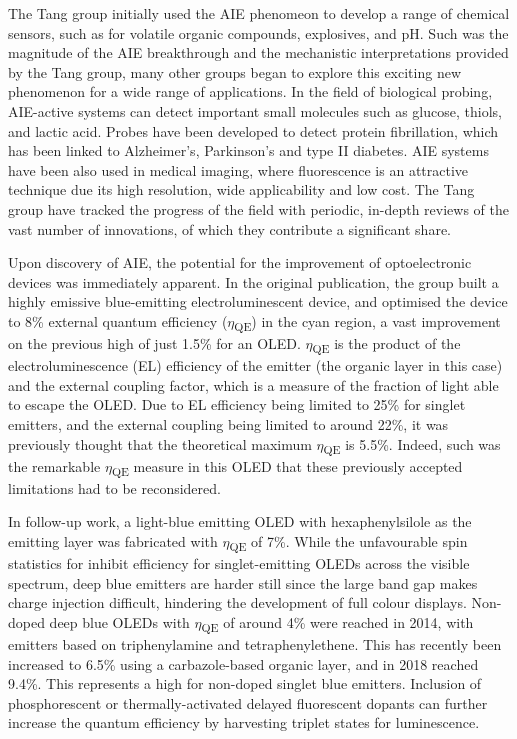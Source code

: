 The Tang group initially used the AIE phenomeon to develop a range of chemical sensors, such as for volatile organic compounds, explosives, and pH.\cite{Dong2007,Li2005,Li2009} Such was the magnitude of the AIE breakthrough and the mechanistic interpretations provided by the Tang group, many other groups began to explore this exciting new phenomenon for a wide range of applications. In the field of biological probing, AIE-active systems can detect important small molecules such as glucose, thiols, and lactic acid.\cite{Wang2014,Yuan2014,Shen2012} Probes have been developed to detect protein fibrillation, which has been linked to Alzheimer's, Parkinson's and type II diabetes.\cite{Hong2012} AIE systems have been also used in medical imaging, where fluorescence is an attractive technique due its high resolution, wide applicability and low cost.\cite{Mei2015} The Tang group have tracked the progress of the field with periodic, in-depth reviews of the vast number of innovations, of which they contribute a significant share.\cite{Hong2009,Wang2010a,Hong2011,Mei2014,Hu2014,Mei2015}

Upon discovery of AIE, the potential for the improvement of optoelectronic devices was immediately apparent. In the original publication, the group built a highly emissive blue-emitting electroluminescent device, and optimised the device to 8\% external quantum efficiency ($\eta$\textsubscript{QE}) in the cyan region, a vast improvement on the previous high of just 1.5\% for an OLED. \cite{Luo2001,Chen2002} $\eta$\textsubscript{QE} is the product of the electroluminescence (EL) efficiency of the emitter (the organic layer in this case) and the external coupling factor, which is a measure of the fraction of light able to escape the OLED. Due to EL efficiency being limited to 25\% for singlet emitters, and the external coupling being limited to around 22\%, it was previously thought that the theoretical maximum $\eta$\textsubscript{QE} is 5.5\%. Indeed, such was the remarkable $\eta$\textsubscript{QE} measure in this OLED that these previously accepted limitations had to be reconsidered.

In follow-up work, a light-blue emitting OLED with hexaphenylsilole as the emitting layer was fabricated with $\eta$\textsubscript{QE} of 7\%.\cite{Chen2003} While the unfavourable spin statistics for inhibit efficiency for singlet-emitting OLEDs across the visible spectrum, deep blue emitters are harder still since the large band gap makes charge injection difficult, hindering the development of full colour displays. Non-doped deep blue OLEDs with $\eta$\textsubscript{QE} of around 4\% were reached in 2014, with emitters based on triphenylamine and tetraphenylethene.\cite{Huang2014,Huang2014a} This has recently been increased to 6.5\% using a carbazole-based organic layer, and in 2018 reached 9.4\%.\cite{KumarKonidena2017,Tang2018} This represents a high for non-doped singlet blue emitters. Inclusion of phosphorescent or thermally-activated delayed fluorescent dopants can further increase the quantum efficiency by harvesting triplet states for luminescence.\cite{Zhu2018}

